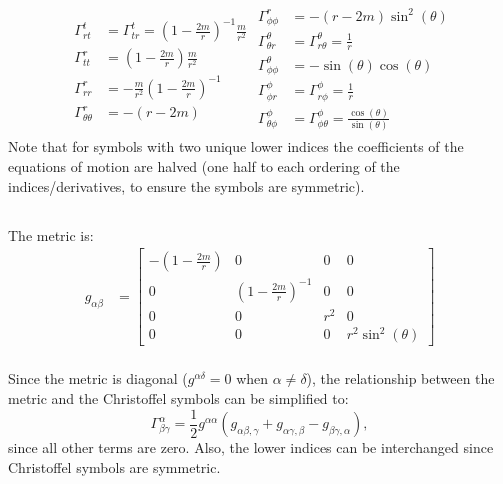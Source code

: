 \documentclass[a4paper]{article}
\begin{document}
\begin{align*}\
	\begin{split}
	\Gamma^t_{r t} &=  \Gamma^t_{t r} = \left(1-\frac{2m}{r}\right)^{-1} \frac{m}{r^2}\\
	\Gamma^r_{tt} &=  \left( 1 - \frac{2m}{r} \right) \frac{m}{r^2}\\
\Gamma^r_{rr} &=   -\frac{m}{r^2} \left(1-\frac{2m}{r}\right)^{-1} \\
\Gamma^r_{\theta \theta} &=  -\left( r - 2m \right)
	\end{split}
	\begin{split}
\Gamma^r_{\phi \phi} &=  -\left( r - 2m \right) \sin^2(\theta)\\
\Gamma^\theta _{\theta r} &= \Gamma^\theta _{r \theta} = \frac{1}{r}\\
\Gamma^\theta _{\phi \phi} &=  -\sin(\theta) \cos(\theta)\\
\Gamma^\phi_{\phi r} &= \Gamma^\phi_{r \phi} =  \frac{1}{r}\\
\Gamma^\phi_{\theta \phi} &= \Gamma^\phi_{\phi \theta} = \frac{ \cos(\theta)}{\sin(\theta)}
	\end{split}
\end{align*}
Note that for symbols with two unique lower indices the coefficients of the equations of motion are halved (one half to each ordering of the indices/derivatives, to ensure the symbols are symmetric).

\subsection{}

The metric is:
\begin{align*}
	g_{\alpha\beta} &= \begin{bmatrix} -\left(1-\frac{2m}{r}\right) & 0 & 0 & 0 \\
		0 & \left( 1 - \frac{2m}{r} \right)^{-1} & 0 & 0\\
		0 & 0 & r^2 & 0 \\
		0 & 0 & 0 & r^2 \sin^2(\theta)
	\end{bmatrix}\\
\end{align*}

Since the metric is diagonal ($g^{\alpha \delta} = 0$ when $\alpha \ne \delta$), the relationship between the metric and the Christoffel symbols can be simplified to:
$$\Gamma^\alpha_{\beta \gamma} = \frac{1}{2} g^{\alpha \alpha}(g_{\alpha \beta , \gamma} + g_{\alpha \gamma , \beta} - g_{\beta \gamma , \alpha}), $$
since all other terms are zero. 
Also, the lower indices can be interchanged since Christoffel symbols are symmetric.
\end{document}
